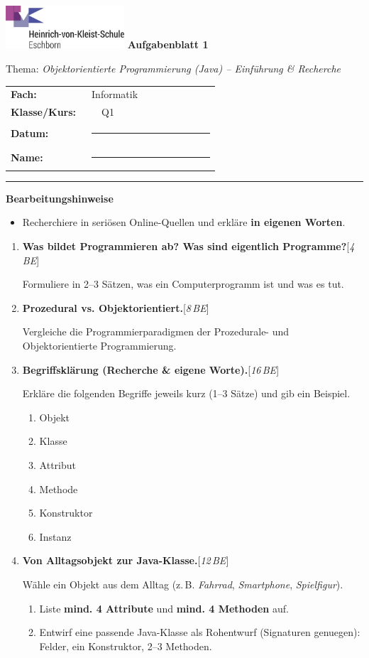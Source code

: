 \documentclass[11pt,a4paper]{scrartcl}
\newcommand{\blatttyp}{Aufgabenblatt 1}
\newcommand{\thema}{\textit{Objektorientierte Programmierung (Java) -- Einführung \& Recherche}}
\newcommand{\sheettitle}[2]{%
	\begin{minipage}[t]{0.62\linewidth}
		\includegraphics[height=1.6cm]{hvk-logo.png}  %
		\vspace{0.6em}
		{\Large\bfseries #1}\par\vspace{-0.2em}
		{\normalsize #2}
	\end{minipage}\hfill
	\begin{minipage}[t]{0.35\linewidth}
		\renewcommand{\arraystretch}{1.2}
		\begin{tabular}{>{\bfseries}p{0.36\linewidth}p{0.58\linewidth}}
			Fach: & Informatik\\
			Klasse/Kurs: & \ \ Q1\\
			Datum: & \rule{3.8cm}{0.4pt} \\
			Name: & \rule{3.8cm}{0.4pt} \\
		\end{tabular}
	\end{minipage}
	\vspace{0.8em}\par\hrule\vspace{1.0em}
}
\newenvironment{aufgaben}{%
	\begin{enumerate}[leftmargin=*,label=\textbf{Aufgabe~\arabic*:}]
	}{\end{enumerate}}
\newcommand{\punkte}[1]{\hfill{\small[\textit{#1\,BE}]}}
\newenvironment{hinweise}{%
	\vspace{0.2em}\textbf{Bearbeitungshinweise}\par
	\begin{itemize}[leftmargin=*,topsep=0.3em,itemsep=0.2em]
	}{\end{itemize}\vspace{0.5em}}
\begin{document}
	
	\sheettitle{\blatttyp}{Thema: \thema}
	
	\begin{hinweise}
		\item Recherchiere in seriösen Online-Quellen und erkläre \textbf{in eigenen Worten}.
	\end{hinweise}
	
	\begin{aufgaben}
		
		\item \textbf{Was bildet Programmieren ab? Was sind eigentlich Programme?}\punkte{4}
		
		Formuliere in 2--3 Sätzen, was ein Computerprogramm ist und was es tut.
		
		\vspace{0.4cm}
		
		\item \textbf{Prozedural vs. Objektorientiert.}\punkte{8}
		
		Vergleiche die Programmierparadigmen der Prozedurale- und Objektorientierte Programmierung.
		\vspace{0.4cm}
		
		\item \textbf{Begriffsklärung (Recherche \& eigene Worte).}\punkte{16}
		
		Erkläre die folgenden Begriffe jeweils kurz (1--3 Sätze) und gib ein Beispiel.
		\begin{enumerate}
			\item Objekt
			\item Klasse
			\item Attribut
			\item Methode
			\item Konstruktor
			\item Instanz
		\end{enumerate}
 
		

		
		\vspace{0.4cm}
		
		\item \textbf{Von Alltagsobjekt zur Java-Klasse.}\punkte{12}
		
		Wähle ein Objekt aus dem Alltag (z.\,B. \emph{Fahrrad}, \emph{Smartphone}, \emph{Spielfigur}).
		\begin{enumerate}[label=\alph*)]
			\item Liste \textbf{mind. 4 Attribute} und \textbf{mind. 4 Methoden} auf.
			\item Entwirf eine passende Java-Klasse als Rohentwurf (Signaturen genuegen): Felder, ein Konstruktor, 2--3 Methoden.
		\end{enumerate}
		

\end{aufgaben}
\end{document}
